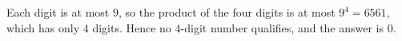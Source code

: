 Each digit is at most $9$, so the product of the four digits is at most $9^4=6561$, which has only $4$ digits. Hence no $4$-digit number qualifies, and the answer is $\boxed{0}$.

